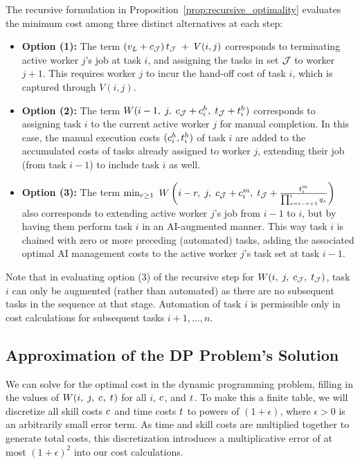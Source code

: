\documentclass{article}
\theoremstyle{plain}
\theoremstyle{plain}
\begin{document}
The recursive formulation in Proposition~\ref{prop:recursive_optimality} evaluates the minimum cost among three distinct alternatives at each step:
\begin{itemize}
    \item \textbf{Option (1):} The term $\left(v_L + c_{\mathcal{J}}\right) t_{\mathcal{J}} \; + \; V(i,j)$ corresponds to terminating active worker $j$'s job at task $i$, and assigning the tasks in set $\mathcal{J}$ to worker $j+1$. 
    This requires worker $j$ to incur the hand-off cost of task $i$, which is captured through $V(i,j)$.

    \item \textbf{Option (2):} The term $W(i-1,\; j,\; c_{\mathcal{J}} + c^{h}_{i},\; t_{\mathcal{J}} + t^{h}_{i})$ corresponds to assigning task $i$ to the current active worker $j$ for manual completion. 
    In this case, the manual execution costs $(c^{h}_{i}, t^{h}_{i})$ of task $i$ are added to the accumulated costs of tasks already assigned to worker $j$, extending their job (from task $i-1$) to include task $i$ as well.

    \item \textbf{Option (3):} The term $\min_{r \geq 1} \ W\left(i - r,\; j,\; c_{\mathcal{J}} + c^{m}_{i},\; t_{\mathcal{J}} + \frac{t^{m}_{i}}{\prod_{s=i-r+1}^{i} q_s}\right)$ also corresponds to extending active worker $j$'s job from $i-1$ to $i$, but by having them perform task $i$ in an AI-augmented manner. 
    This way task $i$ is chained with zero or more preceding (automated) tasks, adding the associated optimal AI management costs to the active worker $j$'s task set at task $i-1$.
\end{itemize}
Note that in evaluating option (3) of the recursive step for $W(i,\; j,\; c_{\mathcal{J}},\; t_{\mathcal{J}})$, task $i$ can only be augmented (rather than automated) as there are no subsequent tasks in the sequence at that stage.
Automation of task $i$ is permissible only in cost calculations for subsequent tasks $i+1, \dots, n$.



\subsection{Approximation of the DP Problem's Solution}
\label{sec:DP_approximation}
We can solve for the optimal cost in the dynamic programming problem, filling in the values of $W(i,\; j,\; c_{},\; t_{})$ for all $i$, $c_{}$, and $t_{}$.  
To make this a finite table, we will discretize all skill costs $c_{}$ and time costs $t_{}$ to powers of $(1+\epsilon)$, where $\epsilon > 0$ is an arbitrarily small error term.
As time and skill costs are multiplied together to generate total costs, this discretization introduces a multiplicative error of at most $(1+\epsilon)^2$ into our cost calculations.
\end{document}
